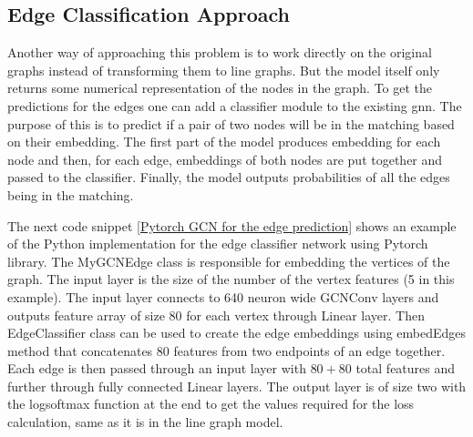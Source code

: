 \subsection{Edge Classification Approach}

Another way of approaching this problem is to work directly on the original graphs instead of transforming them to line graphs. But the model itself only returns some numerical representation of the nodes in the graph. To get the predictions for the edges one can add a classifier module to the existing \gls{gnn}. The purpose of this is to predict if a pair of two nodes will be in the matching based on their embedding. The first part of the model produces embedding for each node and then, for each edge, embeddings of both nodes are put together and passed to the classifier. Finally, the model outputs probabilities of all the edges being in the matching.

The next code snippet \ref{Pytorch GCN for the edge prediction} shows an example of the Python implementation for the edge classifier network using Pytorch library. The MyGCNEdge class is responsible for embedding the vertices of the graph. The input layer is the size of the number of the vertex features (5 in this example). The input layer connects to 640 neuron wide GCNConv layers and outputs feature array of size 80 for each vertex through Linear layer. Then EdgeClassifier class can be used to create the edge embeddings using embedEdges method that concatenates 80 features from two endpoints of an edge together. Each edge is then passed through an input layer with $80+80$ total features and further through fully connected Linear layers. The output layer is of size two with the logsoftmax function at the end to get the values required for the loss calculation, same as it is in the line graph model.

